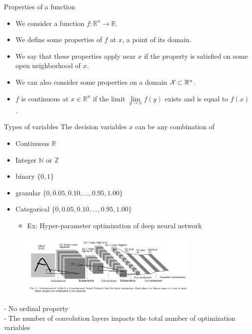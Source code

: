 \documentclass[8pt]{beamer}
\begin{document}
\begin{frame}{Properties of a function}
  \begin{itemize}

    \item
    We consider a function $f: \mathbb{R}^n \rightarrow \mathbb{R}$.
    
    \medskip
    \item
    We define some properties of $f$ {\color{myblue} at $x$}, a point of its domain.
    
    \medskip
    \item
    We say that these properties apply {\color{myblue} near $x$}
    if the property is satisfied on some open neighborhood of $x$.
    
    \medskip
    \item
    We can also consider some properties {\color{myblue} on a domain
    ${\cal X} \subset \mathbb{R}^n$}.
    
    \medskip
    \item
    $f$ is {\color{myblue} continuous} at $x \in \mathbb{R}^n$ if the limit
    $\lim\limits_{y \rightarrow x} f(y)$
    exists and is equal to $f(x)$.
    
    \end{itemize}
\end{frame}

\begin{frame}{Types of variables}
The decision variables $x$ can be any combination of 
\begin{itemize}
  \item Continuous $\mathbb{R}$
  \item Integer $\mathbb{N}$ or $\mathbb{Z}$
  \item binary $\{0,1\}$
  \item granular $\{0,0.05,0.10,...,0.95,1.00\}$
  \item Categorical $\{0,0.05,0.10,...,0.95,1.00\}$
  \begin{itemize}
    \item Ex: Hyper-parameter optimization of deep neural network
  \end{itemize}
\end{itemize}
\begin{figure}[H]
\includegraphics[width=0.8\textwidth]{Figures/CNN.png}
\end{figure}
- No ordinal property\\
- The number of convolution layers impacts the total number of optimization variables
\end{frame}
\end{document}
